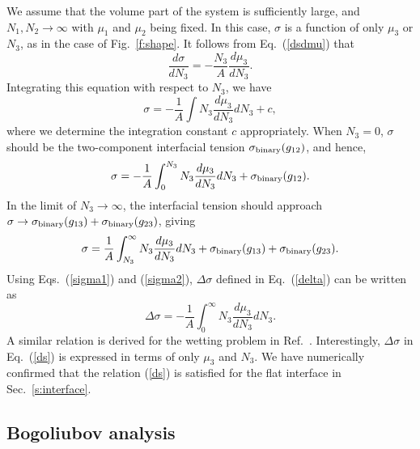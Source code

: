 \documentclass[pra,aps,superscriptaddress,twocolumn,color]{revtex4-1}
\begin{document}
We assume that the volume part of the system is sufficiently large, and
$N_1, N_2 \rightarrow \infty$ with $\mu_1$ and $\mu_2$ being fixed.
In this case, $\sigma$ is a function of only $\mu_3$ or $N_3$, as in the
case of Fig.~\ref{f:shape}.
It follows from Eq.~(\ref{dsdmu}) that
\begin{equation}
  \frac{d\sigma}{d N_3} = -\frac{N_3}{A} \frac{d \mu_3}{d N_3}.
\end{equation}
Integrating this equation with respect to $N_3$, we have
\begin{equation}
  \sigma = -\frac{1}{A} \int N_3 \frac{d\mu_3}{dN_3} dN_3 + c,
\end{equation}
where we determine the integration constant $c$ appropriately.
When $N_3 = 0$, $\sigma$ should be the two-component interfacial tension
$\sigma_{\rm binary}(g_{12})$, and hence,
\begin{equation} \label{sigma1}
  \sigma = -\frac{1}{A} \int_0^{N_3} N_3 \frac{d\mu_3}{dN_3}
  dN_3 + \sigma_{\rm binary}(g_{12}).
\end{equation}
In the limit of $N_3 \rightarrow \infty$, the interfacial tension should
approach $\sigma \rightarrow \sigma_{\rm binary}(g_{13})
+ \sigma_{\rm binary}(g_{23})$, giving
\begin{equation} \label{sigma2}
  \sigma = \frac{1}{A} \int_{N_3}^\infty N_3
  \frac{d\mu_3}{dN_3} dN_3 + \sigma_{\rm binary}(g_{13})
  + \sigma_{\rm binary}(g_{23}).
\end{equation}
Using Eqs.~(\ref{sigma1}) and (\ref{sigma2}), $\Delta\sigma$ defined in
Eq.~(\ref{delta}) can be written as
\begin{equation} \label{ds}
  \Delta\sigma = -\frac{1}{A} \int_0^\infty N_3 \frac{d\mu_3}{dN_3} dN_3.
\end{equation}
A similar relation is derived for the wetting problem in Ref.~\cite{Landau}.
Interestingly, $\Delta\sigma$ in Eq.~(\ref{ds}) is expressed in terms of
only $\mu_3$ and $N_3$.
We have numerically confirmed that the relation (\ref{ds}) is satisfied for
the flat interface in Sec.~\ref{s:interface}.


\subsection{Bogoliubov analysis}
\end{document}
